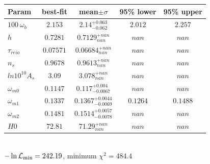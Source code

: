 \begin{tabular}{|l|c|c|c|c|} 
 \hline 
Param & best-fit & mean$\pm\sigma$ & 95\% lower & 95\% upper \\ \hline 
$100~\omega{}_{b }$ &$2.153$ & $2.14_{-0.062}^{+0.063}$ & $2.012$ & $2.257$ \\ 
$h$ &$0.7281$ & $0.7129_{nan}^{+nan}$ & $nan$ & $nan$ \\ 
$\tau{}_{reio }$ &$0.07571$ & $0.06684_{nan}^{+nan}$ & $nan$ & $nan$ \\ 
$n_{s }$ &$0.9678$ & $0.9613_{nan}^{+nan}$ & $nan$ & $nan$ \\ 
$ln10^{10}A_{s }$ &$3.09$ & $3.078_{nan}^{+nan}$ & $nan$ & $nan$ \\ 
$\omega{}_{m0 }$ &$0.1147$ & $0.117_{-0.0067}^{+0.004}$ & $nan$ & $nan$ \\ 
$\omega{}_{m1 }$ &$0.1337$ & $0.1367_{-0.0069}^{+0.0044}$ & $0.1264$ & $0.1488$ \\ 
$\omega{}_{m2 }$ &$0.1481$ & $0.1514_{-0.0078}^{+0.0057}$ & $nan$ & $nan$ \\ 
$H0$ &$72.81$ & $71.29_{nan}^{+nan}$ & $nan$ & $nan$ \\ 
\hline 
 \end{tabular} \\ 
$-\ln{\cal L}_\mathrm{min} =242.19$, minimum $\chi^2=484.4$ \\ 
